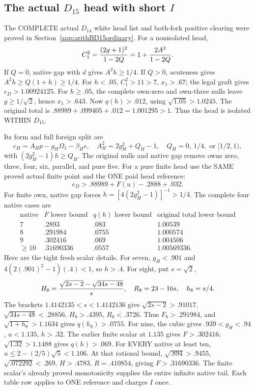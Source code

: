\documentclass[11pt]{article}
\begin{document}
\subsection{The actual \(D_{15}\) head with short \(I\)}
\label{app:arithD15Ihead}

The COMPLETE actual \(D_{14}\) white head list and
both-fork positive clearing were proved in
Section~\ref{app:arithBD15ordinary}.
For a nonisolated head,
\[
 C_1^2={(2g+1)^2\over1-2Q}
       =1+{2A^2\over1-2Q}.
\]
If \(Q=0\), native gap with \(d\) gives \(A^2h\ge1/4\).
If \(Q>0\), acuteness gives
\(A^2h\ge Q(1+h)\ge1/4\).
For \(h<.05\), \(C_1^2>11>7\), \(x_1>.67\);
the legal graft gives \(e_D>1.00924125\).
For \(h\ge.05\), the complete own-zero and own-three
nulls leave \(g\ge1/\sqrt2\), hence \(x_1>.643\).
Now \(q(h)>.012\), using \(\sqrt{1.05}>1.0245\).
The original total is
\(.88989+.099405+.012=1.001295>1\).
Thus the head is isolated WITHIN \(D_{15}\).

Its form and full foreign split are
\[
 c_H=A_Hp-g_H\Omega_1-\beta_He,\quad
 A_H^2=2g_H^2+Q_H-1,\quad
 Q_H=0,\ 1/4,\text{ or }[1/2,1),
\]
with \((2g_H^2-1)h\ge Q_H\).
The original nulls and native gap remove owns zero,
three, four, six, parallel, and pure five.
For a pure finite head use the SAME proved actual
finite point and the ONE paid head reference:
\[
              e_D>.88989+F(u)-.2888+.032 .
\]
For finite own, native gap forces
\(h=[4(2g_H^2-1)]^{-1}>1/4\).
The complete four native cases are
\[
\begin{array}{c|c|c|c}
 \text{native}&F\text{ lower bound}&q(h)\text{ lower bound}
                         &\text{original total lower bound}\\ \hline
7&.2893&.083&1.00539\\
8&.291984&.0755&1.000574\\
9&.302416&.069&1.004506\\
\ge10&.31690336&.0557&1.00569336 .
\end{array}
\]
Here are the tight fresh scalar details.
For seven, \(g_H<.901\) and
\(4(2(.901)^2-1)(.4)<1\), so \(h>.4\).
For eight, put \(s=\sqrt2\),
\[
 H_8={\sqrt{2s-2}-\sqrt{34s-48}\over s},\quad
 R_8=23-16s,\quad h_8=s/4.
\]
The brackets \(1.4142135<s<1.4142136\) give
\(\sqrt{2s-2}>.91017\),
\(\sqrt{34s-48}<.28856\), \(H_8>.4395\),
\(R_8<.3726\).
Thus \(F_8>.291984\), and
\(\sqrt{1+h_8}>1.1634\) gives \(q(h_8)>.0755\).
For nine, the cubic gives \(.939<g_H<.94\),
\(u<1.135\), \(h>.32\).
The earlier finite scalar at \(1.135\) gives
\(F>.302416\); \(\sqrt{1.32}>1.1488\) gives
\(q(h)>.069\).
For EVERY native at least ten,
\(u\le2-(2/5)\sqrt5<1.106\).
At that rational bound,
\(\sqrt{.894}>.9455\), \(\sqrt{.072292}<.269\),
\(H>.4783\), \(R=.410854\),
giving \(F>.31690336\).
The finite scalar's already proved monotonicity supplies
the entire infinite native tail.
Each table row applies to ONE reference and charges \(I\)
once.
\end{document}
